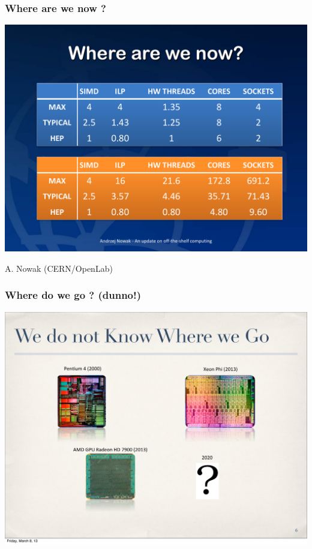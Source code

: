\documentclass[9pt]{beamer}
\begin{document}
\begin{frame}
  \frametitle{Where are we now ?}

  \begin{center}
    \includegraphics[width=1.\textwidth]{figs/nowak-ilp-cores.pdf}
  \end{center}

  A. Nowak (CERN/OpenLab)
\end{frame}

\begin{frame}
  \frametitle{Where do we go ? (dunno!)}


  \begin{center}
    \includegraphics[width=1.\textwidth]{figs/pere-arch-cpus.pdf}
  \end{center}
\end{frame}
\end{document}
